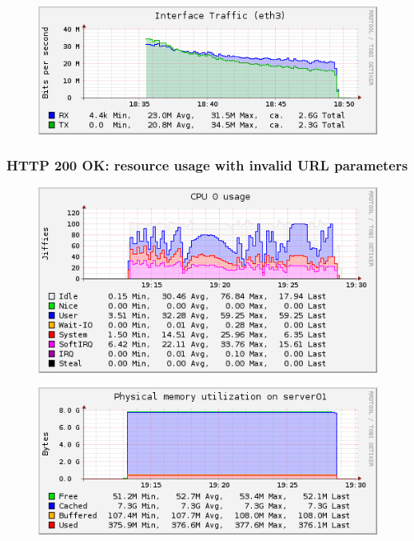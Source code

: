 \documentclass[Measurement results]{subfiles}
\begin{document}
\begin{figure}[H]
\centering
\includegraphics[scale=0.7]{images/results/200_with_naxsi_incremented_allowed_parameters/interface.png}
\end{figure}

\newpage
\subsubsection{HTTP 200 OK: resource usage with invalid URL parameters}
\begin{figure}[H]
\centering
\includegraphics[scale=0.7]{images/results/200_with_naxsi_incremented_disallowed_parameters/cpu.png}
\end{figure}

\begin{figure}[H]
\centering
\includegraphics[scale=0.7]{images/results/200_with_naxsi_incremented_disallowed_parameters/memory.png}
\end{figure}
\end{document}
